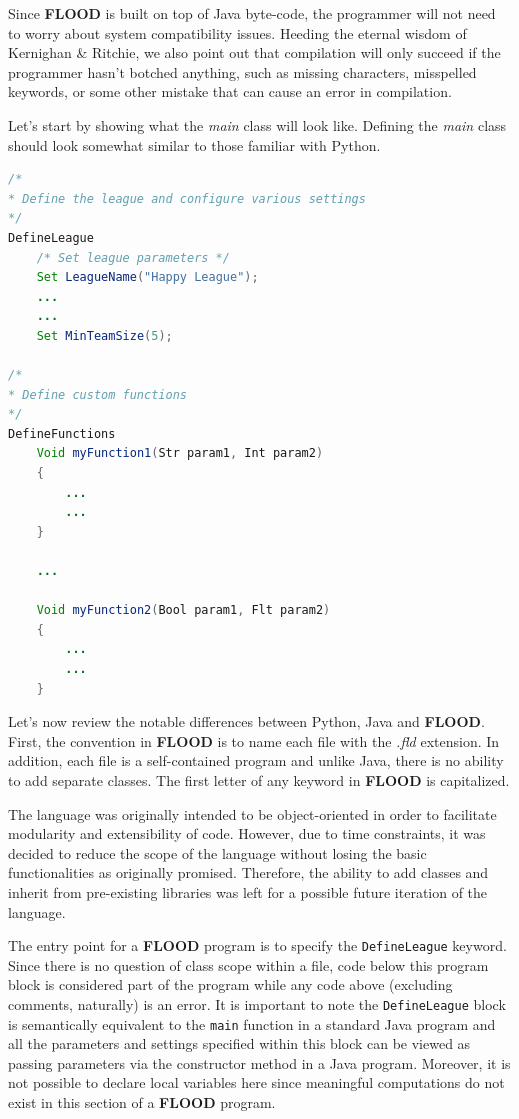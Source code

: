 \documentclass[12pt]{report}
\begin{document}
Since \textbf{FLOOD} is built on top of Java byte-code, the programmer will not need to worry about system compatibility issues. Heeding the eternal wisdom of Kernighan \& Ritchie, we also point out that compilation will only succeed if the programmer hasn't botched anything, such as missing characters, misspelled keywords, or some other mistake that can cause an error in compilation. 

Let's start by showing what the \textit{main} class will look like. Defining the \textit{main} class should look somewhat similar to those familiar with Python.

\begin{singlespace}
\begin{lstlisting}[language=Java,label=some-code,caption={Sample.fld}]
/*
* Define the league and configure various settings
*/
DefineLeague
	/* Set league parameters */
	Set LeagueName("Happy League");
	...
	...
	Set MinTeamSize(5);

/*
* Define custom functions
*/
DefineFunctions
	Void myFunction1(Str param1, Int param2)
	{
		...
		...
	}

	...

	Void myFunction2(Bool param1, Flt param2)
	{
		...
		...
	}
\end{lstlisting}
\end{singlespace}

Let's now review the notable differences between Python, Java and \textbf{FLOOD}. First,  the convention in \textbf{FLOOD} is to name each file with the \textit{.fld} extension. In addition, each file is a self-contained program and unlike Java, there is no ability to add separate classes. The first letter of any keyword in \textbf{FLOOD} is capitalized.

The language was originally intended to be object-oriented in order to facilitate modularity and extensibility of code. However, due to time constraints, it was decided to reduce the scope of the language without losing the basic functionalities as originally promised. Therefore, the ability to add classes and inherit from pre-existing libraries was left for a possible future iteration of the language. 

The entry point for a \textbf{FLOOD} program is to specify the \texttt{DefineLeague} keyword. Since there is no question of class scope within a file, code below this program block is considered part of the program while any code above (excluding comments, naturally) is an error. It is important to note the \texttt{DefineLeague} block is semantically equivalent to the \texttt{main} function in a standard Java program and all the parameters and settings specified within this block can be viewed as passing parameters via the constructor method in a Java program. Moreover, it is not possible to declare local variables here since meaningful computations do not exist in this section of a \textbf{FLOOD} program. 
\end{document}
